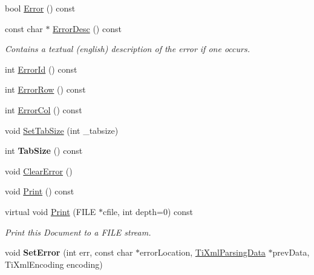 \begin{DoxyCompactItemize}
\item 
bool \hyperlink{class_ti_xml_document_a6dfc01a6e5d58e56acd537dfd3bdeb29}{\-Error} () const 
\item 
\hypertarget{class_ti_xml_document_a9d0f689f6e09ea494ea547be8d79c25e}{
const char $\ast$ \hyperlink{class_ti_xml_document_a9d0f689f6e09ea494ea547be8d79c25e}{\-Error\-Desc} () const }
\label{class_ti_xml_document_a9d0f689f6e09ea494ea547be8d79c25e}

\begin{DoxyCompactList}\small\item\em \-Contains a textual (english) description of the error if one occurs. \end{DoxyCompactList}\item 
int \hyperlink{class_ti_xml_document_af96fc2f3f9ec6422782bfe916c9e778f}{\-Error\-Id} () const 
\item 
int \hyperlink{class_ti_xml_document_af30efc75e804aa2e92fb8be3a8cb676e}{\-Error\-Row} () const 
\item 
int \hyperlink{class_ti_xml_document_aa90bc630ee5203c6109ca5fad3323649}{\-Error\-Col} () const 
\item 
void \hyperlink{class_ti_xml_document_a51dac56316f89b35bdb7d0d433ba988e}{\-Set\-Tab\-Size} (int \-\_\-tabsize)
\item 
\hypertarget{class_ti_xml_document_a612360241b85bad0826b2a9ae9cda561}{
int {\bfseries \-Tab\-Size} () const }
\label{class_ti_xml_document_a612360241b85bad0826b2a9ae9cda561}

\item 
void \hyperlink{class_ti_xml_document_ac66b8c28db86363315712a3574e87c35}{\-Clear\-Error} ()
\item 
void \hyperlink{class_ti_xml_document_af08389ec70ee9b2de7f800e206a18510}{\-Print} () const 
\item 
\hypertarget{class_ti_xml_document_a7b1aea204fee266b70b9c105c8bf2ada}{
virtual void \hyperlink{class_ti_xml_document_a7b1aea204fee266b70b9c105c8bf2ada}{\-Print} (\-F\-I\-L\-E $\ast$cfile, int depth=0) const }
\label{class_ti_xml_document_a7b1aea204fee266b70b9c105c8bf2ada}

\begin{DoxyCompactList}\small\item\em \-Print this \-Document to a \-F\-I\-L\-E stream. \end{DoxyCompactList}\item 
\hypertarget{class_ti_xml_document_a735c23e318597b920c94eae77fa206de}{
void {\bfseries \-Set\-Error} (int err, const char $\ast$error\-Location, \hyperlink{class_ti_xml_parsing_data}{\-Ti\-Xml\-Parsing\-Data} $\ast$prev\-Data, \-Ti\-Xml\-Encoding encoding)}
\label{class_ti_xml_document_a735c23e318597b920c94eae77fa206de}


\end{DoxyCompactItemize}
